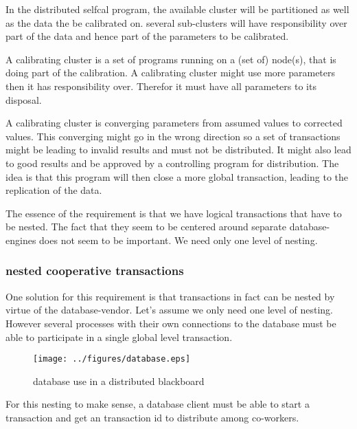 \documentclass[]{lofar}
\begin{document}
      In the distributed selfcal program, the available cluster will
      be partitioned as well as the data the be calibrated on. several
      sub-clusters will have responsibility over part of the data and
      hence part of the parameters to be calibrated.

      A calibrating cluster is a set of programs running on a (set of)
      node(s), that is doing part of the calibration.  A calibrating
      cluster might use more parameters then it has responsibility
      over. Therefor it must have all parameters to its disposal.

      A calibrating cluster is converging parameters from assumed
      values to corrected values. This converging might go in the
      wrong direction so a set of transactions might be leading to
      invalid results and must not be distributed. It might also lead
      to good results and be approved by a controlling program for
      distribution. The idea is that this program will then close a
      more global transaction, leading to the replication of the data.

      The essence of the requirement is that we have logical
      transactions that have to be nested. The fact that they seem to
      be centered around separate database-engines does not seem to be
      important. We need only one level of nesting.

      \subsubsection{nested cooperative transactions}
      \label{subsubsec:nested-cooperative-transaction}\hypertarget{subsubsec:nested-cooperative-transaction}{}

        One solution for this requirement is that transactions in fact
        can be nested by virtue of the database-vendor. Let's assume
        we only need one level of nesting. However several processes
        with their own connections to the database must be able to
        participate in a single global level transaction.

        \begin{figure}
          \texttt{[image: ../figures/database.eps]}
          \hypertarget{fig:database}{}
          \caption{database use in a distributed blackboard\label{fig:database}}
        \end{figure}

        For this nesting to make sense, a database client must be able
        to start a transaction and get an transaction id to distribute
        among co-workers.
\end{document}
